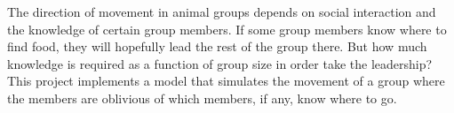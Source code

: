 The direction of movement in animal groups depends on social interaction and the knowledge of certain group members. If some group members know where to find food, they will hopefully lead the rest of the group there. But how much knowledge is required as a function of group size in order take the leadership? This project implements a model that simulates the movement of a group where the members are oblivious of which members, if any, know where to go.